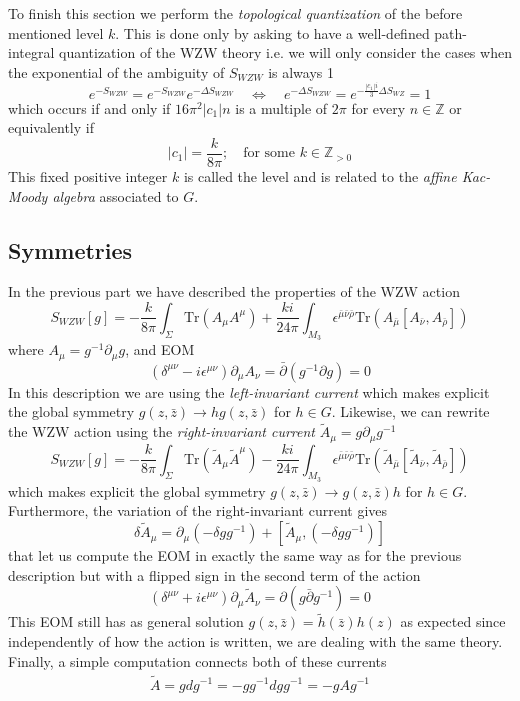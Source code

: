 \documentclass[a4paper,12pt]{article}
\numberwithin{equation}{section}
\numberwithin{thm}{section}
\numberwithin{exm}{section}
\newcommand{\p}{\partial}
\newcommand{\pb}{\bar\partial}
\newcommand{\tr}{\mathrm{Tr}}
\newcommand{\wt}{\widetilde}
\newcommand{\mo}{^{-1}}
\newcommand{\Z}{{\mathbb Z}}
\newcommand{\zb}{{\bar z}}
\newcommand{\<}{{\langle}}
\renewcommand{\>}{{\rangle}}
\renewcommand{\d}{{\delta}}
\newcommand{\D}{{\Delta}}
\newcommand{\e}{{\epsilon}}
\newcommand{\m}{{\mu}}
\newcommand{\n}{{\nu}}
\renewcommand{\S}{{\Sigma}}
\newcommand{\mb}{{\bar\mu}}
\newcommand{\nb}{{\bar\nu}}
\newcommand{\rb}{{\bar\rho}}
\begin{document}
To finish this section we perform the {\it topological quantization} of the before mentioned level $k$. This is done only by asking to have a well-defined path-integral quantization of the WZW theory i.e. we will only consider the cases when the exponential of the ambiguity of $S_{WZW}$ is always 1
	\begin{equation}
	e^{-S_{WZW}} = e^{-S_{WZW}}e^{-\D S_{WZW}}\quad \Leftrightarrow\quad e^{-\D S_{WZW}} = e^{-\frac{|c_1|i}{3}\D S_{WZ}} = 1
	\end{equation}
which occurs if and only if $16\pi^2|c_1|n$ is a multiple of $2\pi$ for every $n\in\Z$ or equivalently if
	\begin{equation}
	|c_1| = \frac{k}{8\pi};\quad\text{for some }k\in\Z_{>0}
	\end{equation}
This fixed positive integer $k$ is called the level and is related to the {\it affine Kac-Moody algebra} associated to $G$.


\subsection{Symmetries}
In the previous part we have described the properties of the WZW action
	\begin{equation}
	S_{WZW}[g] = - \frac{k}{8\pi}\int_{\S} \tr(A_\m A^\m) + \frac{k i}{24\pi}\int_{M_3} \e^{\mb\nb\rb}\tr(A_\mb[A_\nb, A_\rb])
	\end{equation}
where $A_\m = g\mo \p_\m g$, and EOM
	\begin{equation}
	(\d^{\m\n}-i\e^{\m\n})\p_\m A_\n = \pb (g\mo \p g) = 0
	\end{equation}
In this description we are using the {\it left-invariant current} which makes explicit the global symmetry $g(z,\zb)\rightarrow h g(z,\zb)$ for $h\in G$. Likewise, we can rewrite the WZW action using the {\it right-invariant current} $\wt A_\m = g \p_\m g\mo$
	\begin{equation}
	S_{WZW}[g] = - \frac{k}{8\pi}\int_{\S} \tr(\wt A_\m \wt A^\m) - \frac{k i}{24\pi}\int_{M_3} \e^{\mb\nb\rb}\tr(\wt A_\mb[\wt A_\nb, \wt A_\rb])
	\end{equation}
which makes explicit the global symmetry $g(z,\zb)\rightarrow g(z,\zb)h$ for $h\in G$. Furthermore, the variation of the right-invariant current gives
	\begin{equation}
	\d \wt A_\m = \p_\m(-\d g g\mo) + [\wt A_\m, (-\d g g\mo)]
	\end{equation}
that let us compute the EOM in exactly the same way as for the previous description but with a flipped sign in the second term of the action
	\begin{equation}
	(\d^{\m\n} + i \e^{\m\n}) \p_\m \wt A_\n = \p(g\pb g\mo) = 0
	\end{equation}
This EOM still has as general solution $g(z,\zb) = \wt h(\zb) h(z)$ as expected since independently of how the action is written, we are dealing with the same theory. Finally, a simple computation connects both of these currents
	\begin{align}
	\wt A = g d g\mo = - g g\mo dg g\mo = -g A g\mo
	\end{align}
\end{document}
